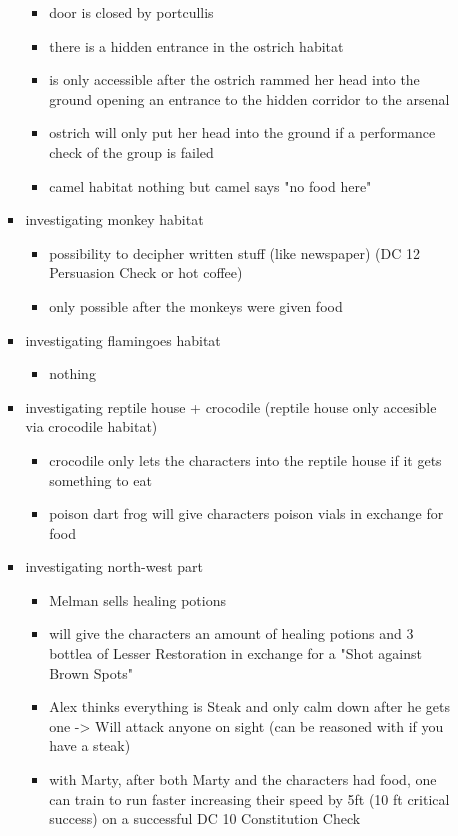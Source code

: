\begin{itemize}
\begin{itemize}
\begin{itemize}
\begin{itemize}
				\item door is closed by portcullis
				\item there is a hidden entrance in the ostrich habitat
				\item is only accessible after the ostrich rammed her head into the ground opening an entrance to the hidden corridor to the arsenal
				\item ostrich will only put her head into the ground if a performance check of the group is failed
				\item camel habitat nothing but camel says "no food here"
			\end{itemize}
			\item investigating monkey habitat
			\begin{itemize}
				\item possibility to decipher written stuff (like newspaper) (DC 12 Persuasion Check or hot coffee)
				\item only possible after the monkeys were given food
			\end{itemize}
			\item investigating flamingoes habitat
			\begin{itemize}
				\item nothing
			\end{itemize}
			\item investigating reptile house + crocodile (reptile house only accesible via crocodile habitat)
			\begin{itemize}
				\item crocodile only lets the characters into the reptile house if it gets something to eat
				\item poison dart frog will give characters poison vials in exchange for food
			\end{itemize}
			\item investigating north-west part
			\begin{itemize}
				\item Melman sells healing potions
				\item will give the characters an amount of healing potions and 3 bottlea of Lesser Restoration in exchange for a "Shot against Brown Spots"
				\item Alex thinks everything is Steak and only calm down after he gets one -> Will attack anyone on sight (can be reasoned with if you have a steak)
				\item with Marty, after both Marty and the characters had food, one can train to run faster increasing their speed by 5ft (10 ft critical success) on a successful DC 10 Constitution Check

\end{itemize}
\end{itemize}
\end{itemize}
\end{itemize}
